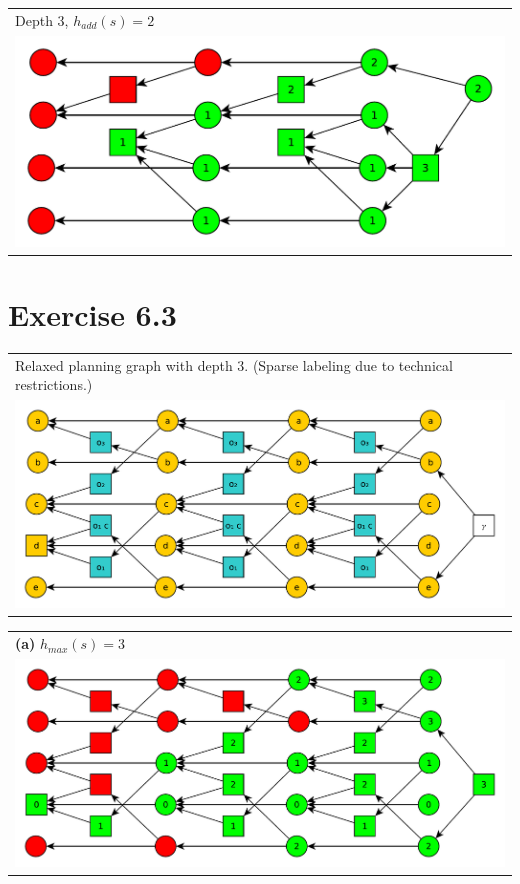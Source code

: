 \documentclass[11pt,a4paper]{article}
\begin{document}
\begin{tabular}{l} %
Depth 3, $h_{add}(s)=2$\\
\includegraphics[scale=0.5]{g621}\\
\end{tabular}

\section*{Exercise 6.3}
\begin{tabular}{l} %
Relaxed planning graph with depth 3. (Sparse labeling due to technical restrictions.)\\
\includegraphics[scale=0.5]{g63}\\
\end{tabular}

\begin{tabular}{l} %
\textbf{(a)} $h_{max}(s)=3$\\
\includegraphics[scale=0.5]{g63a}\\
\end{tabular}
\end{document}
